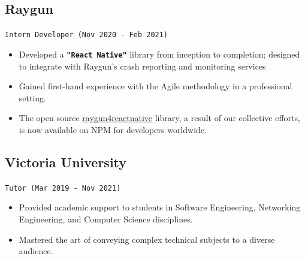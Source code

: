 \documentclass[a4paper, 10pt]{article}
\newcommand{\code}[1]{\textcolor{code}{\textbf{\texttt{"#1"}}}}
\begin{document}
\begin{multicols*}{2}
	\subsection{Raygun}
	\texttt{Intern Developer (Nov 2020 - Feb 2021)}
	\begin{itemize}[itemsep=0pt, leftmargin=0pt]
		\item Developed a \code{React Native} library from inception to completion; designed to integrate with Raygun's crash reporting and monitoring services
		\item Gained first-hand experience with the Agile methodology in a professional setting.
		\item The open source \href{https://www.npmjs.com/package/raygun4reactnative}{raygun4reactnative} library, a result of our collective efforts, is now available on NPM for developers worldwide.
	\end{itemize}
	\subsection{Victoria University}
	\texttt{Tutor (Mar 2019 - Nov 2021)}
	\begin{itemize}[itemsep=0pt, leftmargin=0pt]
		\item Provided academic support to students in Software Engineering, Networking Engineering, and Computer Science disciplines.
		\item Mastered the art of conveying complex technical subjects to a diverse audience.
	\end{itemize}
\end{multicols*}
\end{document}
